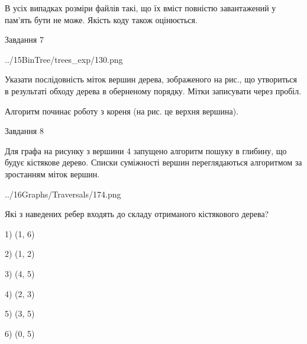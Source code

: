 \documentclass[12pt, ukrainian]{article}
\begin{document}
{В усіх випадках розміри файлів такі, що їх вміст повністю завантажений у пам'ять бути не може. Якість коду також оцінюється.



\vspace{10mm}\par

\newpage
\begin{minipage}[t]{9.7cm}
               
{\begin{center}Завдання {7}\end{center}}
\vspace{-4mm}

\begin{center}
	{../15BinTree/trees_exp/130.png}
\end{center}
Указати послідовність міток вершин дерева, зображеного на рис., що утвориться в результаті обходу дерева в оберненому порядку. Мітки записувати через пробіл.\par Алгоритм починає роботу з кореня (на рис. це верхня вершина).\par

\end{minipage}
\vline \hspace{8mm}
\begin{minipage}[t]{8.0cm}
               
{\begin{center}Завдання {8}\end{center}}
\vspace{-4mm}
Для графа на рисунку з вершини 4 запущено алгоритм пошуку в глибину, що будує кістякове дерево. Списки суміжності вершин переглядаються алгоритмом за зростанням міток вершин.\par
\begin{center}
	{../16Graphs/Traversals/174.png}
\end{center}
\par Які з наведених ребер входять до складу отриманого кістякового дерева?\par
1) (1, 6)\par
2) (1, 2)\par
3) (4, 5)\par
4) (2, 3)\par
5) (3, 5)\par
6) (0, 5)\par
{\vskip 15pt} \par


\end{minipage}}
\end{document}
